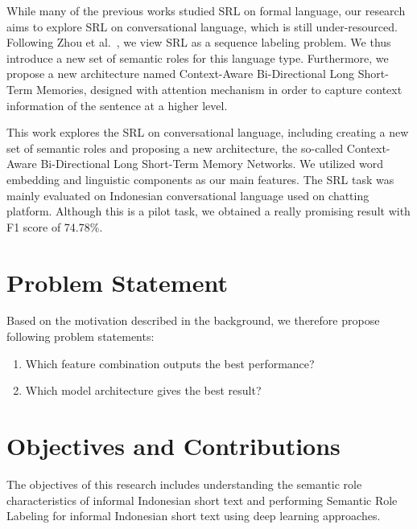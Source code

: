 	
	While many of the previous works studied SRL on formal language, our research aims to explore SRL on conversational language, which is still under-resourced. Following Zhou et al.~\cite{zhou2015end}, we view SRL as a sequence labeling problem. We thus introduce a new set of semantic roles for this language type. Furthermore, we propose a new architecture named Context-Aware Bi-Directional Long Short-Term Memories, designed with attention mechanism in order to capture context information of the sentence at a higher level.
	
	This work explores the SRL on conversational language, including creating a new set of semantic roles and proposing a new architecture, the so-called Context-Aware Bi-Directional Long Short-Term Memory Networks. We utilized word embedding and linguistic components as our main features. The SRL task was mainly evaluated on Indonesian conversational language used on chatting platform. Although this is a pilot task, we obtained a really promising result with F1 score of 74.78\%.

\section{Problem Statement}
Based on the motivation described in the background, we therefore propose following problem statements:
\begin{enumerate}
	\item Which feature combination outputs the best performance?
	\item Which model architecture gives the best result?
\end{enumerate}

\section{Objectives and Contributions}


The objectives of this research includes understanding the semantic role characteristics of informal Indonesian short text and performing Semantic Role Labeling for informal Indonesian short text using deep learning approaches.

